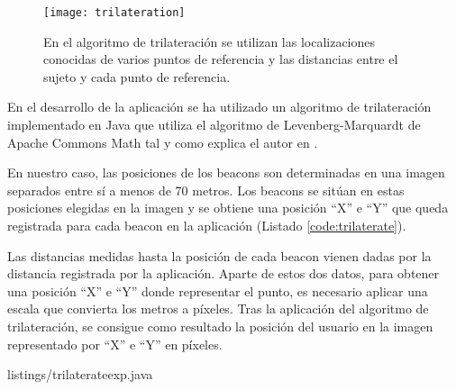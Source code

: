 \begin{figure}[H]
	\centering
	\texttt{[image: trilateration]}
	\caption{En el algoritmo de trilateración se utilizan las localizaciones conocidas de varios puntos de referencia y las distancias entre el sujeto y cada punto de referencia.}
	\label{fig:trilateration}
\end{figure}


En el desarrollo de la aplicación se ha utilizado un algoritmo de trilateración implementado en Java que utiliza el algoritmo de Levenberg-Marquardt \cite{URL::algoritmolm} de Apache Commons Math \cite{URL::apachemath} tal y como explica el autor en \cite{URL::trilateracion}. 


En nuestro caso, las posiciones de los beacons son determinadas en una imagen separados entre sí a menos de 70 metros. Los beacons se sitúan en estas posiciones elegidas en la imagen y se obtiene una posición ``X'' e ``Y'' que queda registrada para cada beacon en la aplicación (Listado \ref{code:trilaterate}). 

Las distancias medidas hasta la posición de cada beacon vienen dadas por la distancia registrada por la aplicación. Aparte de estos dos datos, para obtener una posición ``X'' e ``Y'' donde representar el punto, es necesario aplicar una escala que convierta los metros a píxeles. Tras la aplicación del algoritmo de trilateración, se consigue como resultado la posición del usuario en la imagen representado por ``X'' e ``Y'' en píxeles.


{listings/trilaterateexp.java} %

